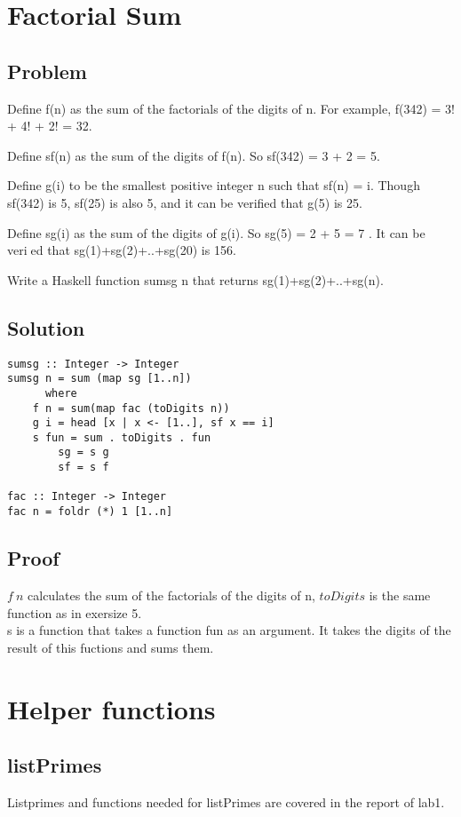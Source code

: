 \documentclass[a4paper,11pt]{article}
\begin{document}
\section{Factorial Sum}
\subsection{Problem}

Define f(n) as the sum of the factorials of the digits of n. For example, f(342) = 3!  + 4!  + 2!  = 32.

Define sf(n) as the sum of the digits of f(n). So sf(342) = 3 + 2 = 5.

Define g(i) to be the smallest positive integer n such that sf(n) = i. Though sf(342) is 5, sf(25)
is also 5,  and it can be verified that g(5) is 25.

Define sg(i) as  the  sum  of  the  digits  of g(i).   So sg(5) = 2 + 5 = 7 . It  can  be  veried  that sg(1)+sg(2)+..+sg(20) is 156.

Write a Haskell function sumsg n that returns sg(1)+sg(2)+..+sg(n).
\subsection{Solution}

\begin{lstlisting}
sumsg :: Integer -> Integer
sumsg n = sum (map sg [1..n])
      where
	f n = sum(map fac (toDigits n))
	g i = head [x | x <- [1..], sf x == i]
	s fun = sum . toDigits . fun
      	sg = s g
      	sf = s f

fac :: Integer -> Integer
fac n = foldr (*) 1 [1..n]
\end{lstlisting}

\subsection{Proof}
$f\: n$ calculates the sum of the factorials of the digits of n, $toDigits$ is the same function as in exersize 5. \\
s is a function that takes a function fun as an argument. It takes the digits of the result of this fuctions and sums them.

\section{Helper functions}

\subsection{listPrimes}
Listprimes and functions needed for listPrimes are covered in the report of lab1.
\end{document}
